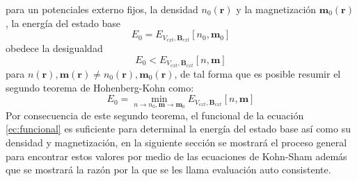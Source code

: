 \documentclass[12pt,a4paper, oneside]{book}
\begin{document}
  para un potenciales externo  fijos, la densidad $n_0 (\pmb{r})$ y la magnetizaci\'on $\pmb{m}_0 (\pmb{r})$, la energ\'ia del estado base 
  \begin{equation}
  E_0= E_{V_{ext}, \pmb{B}_{ext}}[n_0,\pmb{m}_0] \label{ec:estadoBase}
  \end{equation}
  obedece la desigualdad
  \begin{equation}
  E_0 < E_{V_{ext}, \pmb{B}_{ext}}[n,\pmb{m}] \label{ec:desig}
  \end{equation}
  para $ n (\pmb{r}),\pmb{m} (\pmb{r}) \not = n_0 (\pmb{r}),\pmb{m}_0 (\pmb{r})$, de tal forma que es posible resumir el segundo  teorema de Hohenberg-Kohn como:
  \begin{equation}
  E_0 = \min_{n  \to n_0, \pmb{m} \to \pmb{m}_0} E_{V_{ext}, \pmb{B}_{ext}}[n,\pmb{m}]  \label{ec:HKII}
  \end{equation}
  Por consecuencia de este segundo teorema, el funcional de la ecuaci\'on \ref{ec:funcional} es suficiente para determinal la energ\'ia del estado base as\'i como su densidad y magnetizaci\'on, en la siguiente secci\'on se mostrar\'a el proceso general para encontrar estos valores por medio de las ecuaciones de Kohn-Sham adem\'as que se mostrar\'a la raz\'on por la que se les llama evaluaci\'on auto consistente.
  
\end{document}

